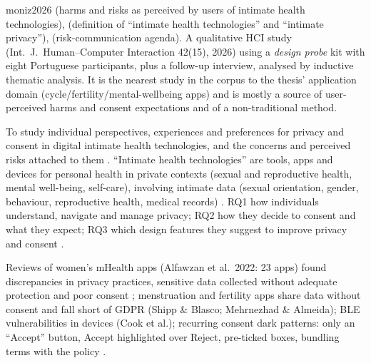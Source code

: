 \begin{papercard}{moniz2026}
  (harms and risks as perceived by users of intimate health technologies),  (definition of ``intimate health technologies'' and ``intimate privacy''),  (risk-communication agenda). A qualitative HCI study (Int.\ J.\ Human--Computer Interaction 42(15), 2026) using a \emph{design probe} kit with eight Portuguese participants, plus a follow-up interview, analysed by inductive thematic analysis. It is the nearest study in the corpus to the thesis' application domain (cycle/fertility/mental-wellbeing apps) and is mostly a source of user-perceived harms and consent expectations and of a non-traditional method.

 To study individual perspectives, experiences and preferences for privacy and consent in digital intimate health technologies, and the concerns and perceived risks attached to them . ``Intimate health technologies'' are tools, apps and devices for personal health in private contexts (sexual and reproductive health, mental well-being, self-care), involving intimate data (sexual orientation, gender, behaviour, reproductive health, medical records) . RQ1 how individuals understand, navigate and manage privacy; RQ2 how they decide to consent and what they expect; RQ3 which design features they suggest to improve privacy and consent .

 Reviews of women's mHealth apps (Alfawzan et al.\ 2022: 23 apps) found discrepancies in privacy practices, sensitive data collected without adequate protection and poor consent ; menstruation and fertility apps share data without consent and fall short of GDPR (Shipp \& Blasco; Mehrnezhad \& Almeida); BLE vulnerabilities in devices (Cook et al.); recurring consent dark patterns: only an ``Accept'' button, Accept highlighted over Reject, pre-ticked boxes, bundling terms with the policy .


\end{papercard}

